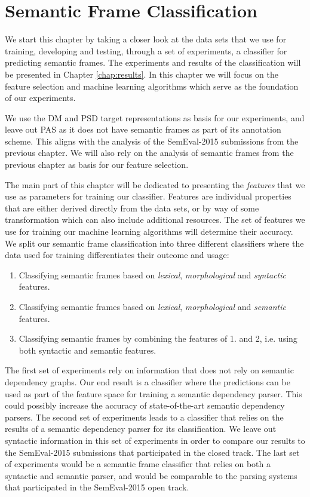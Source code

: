\chapter{Semantic Frame Classification}
\label{chap:experiments}


We start this chapter by taking a closer look at the data sets that we use for training, developing and testing, through a set of experiments, a classifier for predicting semantic frames. The experiments and results of the classification will be presented in Chapter \ref{chap:results}. In this chapter we will focus on the feature selection and machine learning algorithms which serve as the foundation of our experiments. 

We use the DM and PSD target representations as basis for our experiments, and leave out PAS as it does not have semantic frames as part of its annotation scheme. This aligns with the analysis of the SemEval-2015 submissions from the previous chapter. We will also rely on the analysis of semantic frames from the previous chapter as basis for our feature selection.

The main part of this chapter will be dedicated to presenting the \textit{features} that we use as parameters for training our classifier. Features are individual properties that are either derived directly from the data sets, or by way of some transformation which can also include additional resources. The set of features we use for training our machine learning algorithms will determine their accuracy. We split our semantic frame classification into three different classifiers where the data used for training differentiates their outcome and usage:

\begin{enumerate}
    \item Classifying semantic frames based on \textit{lexical}, \textit{morphological} and \textit{syntactic} features.
    \item Classifying semantic frames based on \textit{lexical}, \textit{morphological} and \textit{semantic} features.
    \item Classifying semantic frames by combining the features of 1. and 2, i.e. using both syntactic and semantic features.
\end{enumerate}

The first set of experiments rely on information that does not rely on semantic dependency graphs. Our end result is a classifier where the predictions can be used as part of the feature space for training a semantic dependency parser. This could possibly increase the accuracy of state-of-the-art semantic dependency parsers. The second set of experiments leads to a classifier that relies on the results of a semantic dependency parser for its classification. We leave out syntactic information in this set of experiments in order to compare our results to the SemEval-2015 submissions that participated in the closed track. The last set of experiments would be a semantic frame classifier that relies on both a syntactic and semantic parser, and would be comparable to the parsing systems that participated in the SemEval-2015 open track.

